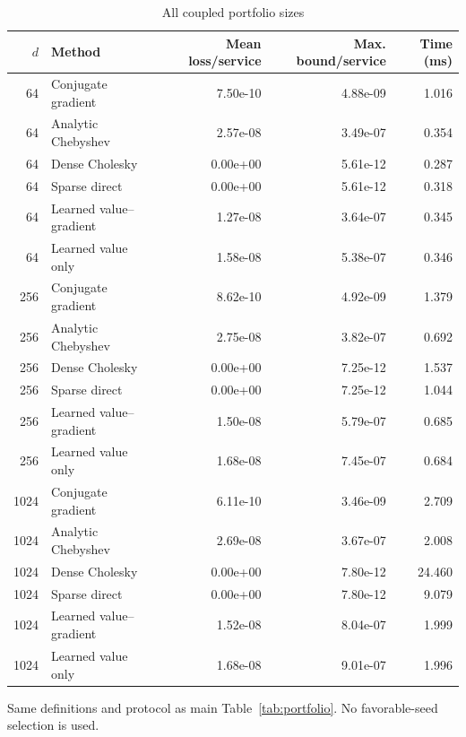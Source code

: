 \begin{table}[!ht]
\centering
\caption{All coupled portfolio sizes}\label{tab:portfolio-all}
\begin{tabular}{rlrrr}\toprule
$d$ & Method & Mean loss/service & Max. bound/service & Time (ms)\\
\midrule
64 & Conjugate gradient & 7.50e-10 & 4.88e-09 & 1.016\\
64 & Analytic Chebyshev & 2.57e-08 & 3.49e-07 & 0.354\\
64 & Dense Cholesky & 0.00e+00 & 5.61e-12 & 0.287\\
64 & Sparse direct & 0.00e+00 & 5.61e-12 & 0.318\\
64 & Learned value--gradient & 1.27e-08 & 3.64e-07 & 0.345\\
64 & Learned value only & 1.58e-08 & 5.38e-07 & 0.346\\
256 & Conjugate gradient & 8.62e-10 & 4.92e-09 & 1.379\\
256 & Analytic Chebyshev & 2.75e-08 & 3.82e-07 & 0.692\\
256 & Dense Cholesky & 0.00e+00 & 7.25e-12 & 1.537\\
256 & Sparse direct & 0.00e+00 & 7.25e-12 & 1.044\\
256 & Learned value--gradient & 1.50e-08 & 5.79e-07 & 0.685\\
256 & Learned value only & 1.68e-08 & 7.45e-07 & 0.684\\
1024 & Conjugate gradient & 6.11e-10 & 3.46e-09 & 2.709\\
1024 & Analytic Chebyshev & 2.69e-08 & 3.67e-07 & 2.008\\
1024 & Dense Cholesky & 0.00e+00 & 7.80e-12 & 24.460\\
1024 & Sparse direct & 0.00e+00 & 7.80e-12 & 9.079\\
1024 & Learned value--gradient & 1.52e-08 & 8.04e-07 & 1.999\\
1024 & Learned value only & 1.68e-08 & 9.01e-07 & 1.996\\
\bottomrule\end{tabular}
\par\smallskip\begin{minipage}{.98\textwidth}\small Same definitions and protocol as main Table~\ref{tab:portfolio}. No favorable-seed selection is used.\end{minipage}
\end{table}
